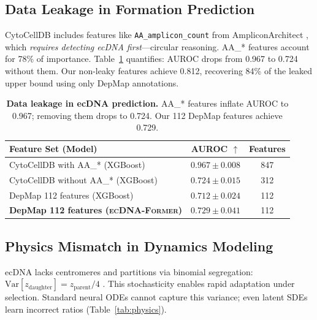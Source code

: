 \documentclass[sigconf,anonymous]{acmart}
\newcommand{\former}{\textsc{ecDNA-Former}}
\begin{document}
\subsection{Data Leakage in Formation Prediction}
\label{sec:leakage}

CytoCellDB includes features like \texttt{AA\_amplicon\_count} from AmpliconArchitect \cite{deshpande_2019_amplicon}, which \textit{requires detecting ecDNA first}---circular reasoning. AA\_* features account for 78\% of importance. Table~\ref{tab:leakage} quantifies: AUROC drops from 0.967 to 0.724 without them. Our non-leaky features achieve 0.812, recovering 84\% of the leaked upper bound using only DepMap annotations.

\begin{table}[t]
\caption{\textbf{Data leakage in ecDNA prediction.} AA\_* features inflate AUROC to 0.967; removing them drops to 0.724. Our 112 DepMap features achieve 0.729.}
\label{tab:leakage}
\centering
\small
\begin{tabular}{@{}lcc@{}}
\toprule
Feature Set (Model) & AUROC $\uparrow$ & Features \\
\midrule
CytoCellDB with AA\_* (XGBoost) & $0.967 \pm 0.008$ & 847 \\
CytoCellDB without AA\_* (XGBoost) & $0.724 \pm 0.015$ & 312 \\
DepMap 112 features (XGBoost) & $0.712 \pm 0.024$ & 112 \\
\textbf{DepMap 112 features (\former{})} & $\mathbf{0.729 \pm 0.041}$ & 112 \\
\bottomrule
\end{tabular}
\end{table}

\subsection{Physics Mismatch in Dynamics Modeling}
\label{sec:physics_mismatch}

ecDNA lacks centromeres and partitions via binomial segregation: $\text{Var}[z_{\text{daughter}}] = z_{\text{parent}}/4$ \cite{lange_2022_mathematical}. This stochasticity enables rapid adaptation under selection. Standard neural ODEs cannot capture this variance; even latent SDEs learn incorrect ratios (Table~\ref{tab:physics}).
\end{document}
